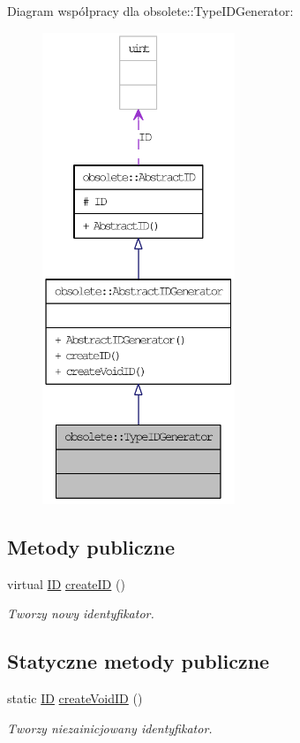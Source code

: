 Diagram współpracy dla obsolete::TypeIDGenerator:\nopagebreak
\begin{figure}[H]
\begin{center}
\leavevmode
\includegraphics[height=400pt]{classobsolete_1_1TypeIDGenerator__coll__graph}
\end{center}
\end{figure}
\subsection*{Metody publiczne}
\begin{DoxyCompactItemize}
\item 
virtual \hyperlink{classobsolete_1_1ID}{ID} \hyperlink{classobsolete_1_1AbstractIDGenerator_a39d2f0147e3a028fef8299770e23db90}{createID} ()
\begin{DoxyCompactList}\small\item\em Tworzy nowy identyfikator. \item\end{DoxyCompactList}\end{DoxyCompactItemize}
\subsection*{Statyczne metody publiczne}
\begin{DoxyCompactItemize}
\item 
static \hyperlink{classobsolete_1_1ID}{ID} \hyperlink{classobsolete_1_1AbstractIDGenerator_a330da88ba80820ca6ce0a29cbbab9e1b}{createVoidID} ()
\begin{DoxyCompactList}\small\item\em Tworzy niezainicjowany identyfikator. \item\end{DoxyCompactList}\end{DoxyCompactItemize}
